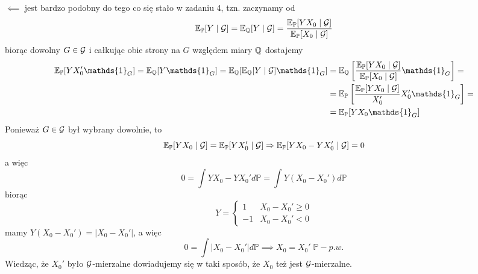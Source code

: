 \documentclass{article}
\newcommand{\E}{\mathbb{E}}
\renewcommand{\P}{\mathbb{P}}
\begin{document}
$\impliedby$ jest bardzo podobny do tego co się stało w zadaniu 4, tzn. zaczynamy od
$$\E_{\P}[Y\;|\;\set{G}]=\E_{\Q}[Y\;|\;\set{G}]=\frac{\E_{\P}[YX_0\;|\;\set{G}]}{\E_{\P}[X_0\;|\;\set{G}]}$$
biorąc dowolny $G\in\mathcal{G}$ i całkując obie strony na $G$ względem miary $\operatorname{\mathbb{Q}}$ dostajemy
\begin{align*}
  \E_{\P}[YX_0'\mathds{1}_G]=\E_{\Q}[Y\mathds{1}_G]=\E_{\Q}[\E_{\Q}[Y\;|\;\set{G}]\mathds{1}_G]&=\E_{\Q}\left[ \frac{\E_{\P}[YX_0\;|\;\set{G}]}{\E_{\P}[X_0\;|\;\set{G}]}\mathds{1}_G \right]=\\
                                                                    &=\E_{\P}\left[ \frac{\E_{\P}[YX_0\;|\;\set{G}]}{X_0'}X_0'\mathds{1}_G \right]=\\ 
                                                                    &=\E_{\P}[YX_0\mathds{1}_G]
\end{align*}
Ponieważ $G\in\mathcal{G}$ był wybrany dowolnie, to
$$\E_{\P}[YX_0\;|\;\set{G}]=\E_{\P}[YX_0'\;|\;\set{G}]\implies \E_{\P}[YX_0-YX_0'\;|\;\set{G}]=0$$
a więc
$$0=\int YX_0-YX_0'd\P=\int Y(X_0-X_0')d\P$$
biorąc
$$Y=\begin{cases}1&X_0-X_0'\geq0\\-1&X_0-X_0'<0\end{cases}$$
mamy $Y(X_0-X_0')=|X_0-X_0'|$, a więc
$$0=\int |X_0-X_0'|d\P\implies X_0=X_0'\;\P-p.w.$$
Wiedząc, że $X_0'$ było $\mathcal{G}$-mierzalne dowiadujemy się w taki sposób, że $X_0$ też jest $\mathcal{G}$-mierzalne.
\end{document}
